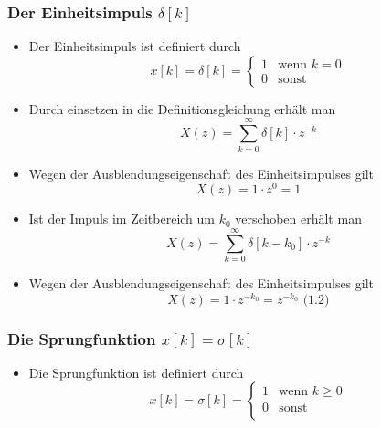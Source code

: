 \documentclass[11pt]{article}
\providecommand{\tightlist}{%
      \setlength{\itemsep}{0pt}\setlength{\parskip}{0pt}}
\begin{document}
    \subsubsection{\texorpdfstring{Der Einheitsimpuls
\(\delta[k]\)}{Der Einheitsimpuls \textbackslash{}delta{[}k{]}}}\label{der-einheitsimpuls-deltak}

\begin{itemize}
\tightlist
\item
  Der Einheitsimpuls ist definiert durch\\
  \[
  \displaystyle x[k] = \delta[k] = \begin{cases}
   1 & \text{wenn $k = 0$} \\ 
   0 & \text{sonst} 
   \end{cases}
  \]
\end{itemize}

    \begin{itemize}
\tightlist
\item
  Durch einsetzen in die Definitionsgleichung erhält man
  \[X(z) = \sum_{k=0}^\infty \delta[k] \cdot z^{-k}\]
\end{itemize}

    \begin{itemize}
\tightlist
\item
  Wegen der Ausblendungseigenschaft des Einheitsimpulses gilt
  \[X(z) = 1 \cdot z^0 = 1\]
\end{itemize}

    \begin{itemize}
\tightlist
\item
  Ist der Impuls im Zeitbereich um \(k_0\) verschoben erhält man
  \[X(z) = \sum_{k=0}^\infty \delta[k-k_0] \cdot z^{-k}\]
\end{itemize}

    \begin{itemize}
\tightlist
\item
  Wegen der Ausblendungseigenschaft des Einheitsimpulses gilt
  \[X(z) = 1 \cdot z^{-k_0} = z^{-k_0}\textrm{  (1.2)}\]
\end{itemize}

    \subsubsection{\texorpdfstring{Die Sprungfunktion
\(x[k] = \sigma[k]\)}{Die Sprungfunktion x{[}k{]} = \textbackslash{}sigma{[}k{]}}}\label{die-sprungfunktion-xk-sigmak}

\begin{itemize}
\tightlist
\item
  Die Sprungfunktion ist definiert durch \[
  \displaystyle x[k] = \sigma[k] = \begin{cases}
   1 & \text{wenn $k \geq 0$} \\ 
   0 & \text{sonst} \\ 
   \end{cases}
  \]
\end{itemize}
\end{document}
